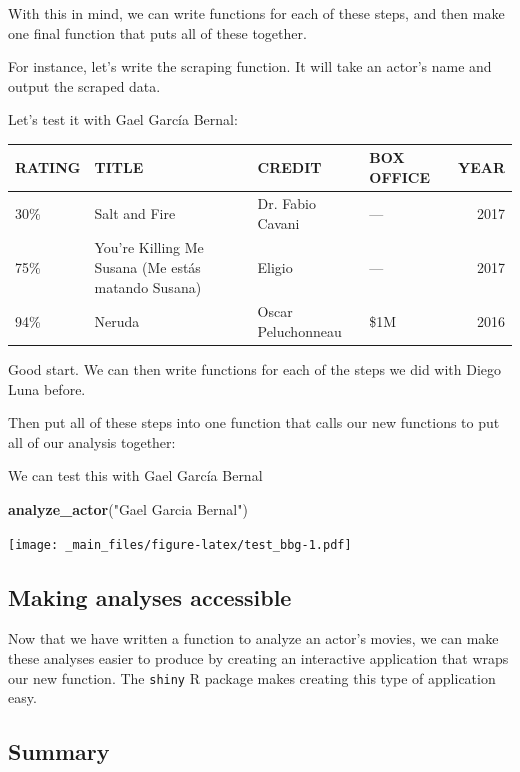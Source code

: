 \documentclass[]{article}
\newenvironment{Shaded}{\begin{snugshade}}{\end{snugshade}}
\newcommand{\KeywordTok}[1]{\textcolor[rgb]{0.13,0.29,0.53}{\textbf{{#1}}}}
\newcommand{\StringTok}[1]{\textcolor[rgb]{0.31,0.60,0.02}{{#1}}}
\newcommand{\NormalTok}[1]{{#1}}
\theoremstyle{definition}
\theoremstyle{definition}
\theoremstyle{remark}
\begin{document}
With this in mind, we can write functions for each of these steps, and
then make one final function that puts all of these together.

For instance, let's write the scraping function. It will take an actor's
name and output the scraped data.

Let's test it with Gael García Bernal:

\begin{tabular}{l|l|l|l|r}
\hline
RATING & TITLE & CREDIT & BOX OFFICE & YEAR\\
\hline
30\% & Salt and Fire & Dr. Fabio Cavani & — & 2017\\
\hline
75\% & You're Killing Me Susana (Me estás matando Susana) & Eligio & — & 2017\\
\hline
94\% & Neruda & Oscar Peluchonneau & \$1M & 2016\\
\hline
\end{tabular}

Good start. We can then write functions for each of the steps we did
with Diego Luna before.

Then put all of these steps into one function that calls our new
functions to put all of our analysis together:

We can test this with Gael García Bernal

\begin{Shaded}
\begin{Highlighting}[]
\KeywordTok{analyze_actor}\NormalTok{(}\StringTok{"Gael Garcia Bernal"}\NormalTok{)}
\end{Highlighting}
\end{Shaded}

\texttt{[image: \_main\_files/figure-latex/test\_bbg-1.pdf]}

\subsection{Making analyses
accessible}\label{making-analyses-accessible}

Now that we have written a function to analyze an actor's movies, we can
make these analyses easier to produce by creating an interactive
application that wraps our new function. The \texttt{shiny} R package
makes creating this type of application easy.

\subsection{Summary}\label{summary}
\end{document}
